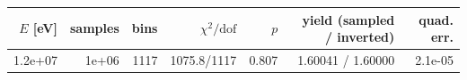 \begin{tabular}{rrrrrrr}
\toprule
$E$ [eV] & samples & bins & $\chi^2/\mathrm{dof}$ & $p$ & yield (sampled / inverted) & quad. err. \\
\midrule
1.2e+07 & 1e+06 & 1117 & 1075.8/1117 & 0.807 & 1.60041 / 1.60000 & 2.1e-05 \\
\bottomrule
\end{tabular}
